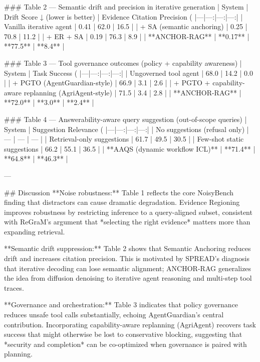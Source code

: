 ### Table 2 — Semantic drift and precision in iterative generation  
| System | Drift Score ↓ (lower is better) | Evidence Citation Precision (%
|---|---:|---:|---:|
| Vanilla iterative agent | 0.41 | 62.0 | 16.5 |
| + SA (semantic anchoring) | 0.25 | 70.8 | 11.2 |
| + ER + SA | 0.19 | 76.3 | 8.9 |
| **ANCHOR-RAG** | **0.17** | **77.5** | **8.4** |

### Table 3 — Tool governance outcomes (policy + capability awareness)  
| System | Task Success (%
|---|---:|---:|---:|
| Ungoverned tool agent | 68.0 | 14.2 | 0.0 |
| + PGTO (AgentGuardian-style) | 66.9 | 3.1 | 2.6 |
| + PGTO + capability-aware replanning (AgriAgent-style) | 71.5 | 3.4 | 2.8 |
| **ANCHOR-RAG** | **72.0** | **3.0** | **2.4** |

### Table 4 — Answerability-aware query suggestion (out-of-scope queries)  
| System | Suggestion Relevance (%
|---|---:|---:|---:|
| No suggestions (refusal only) | — | — | — |
| Retrieval-only suggestions | 61.7 | 49.5 | 30.5 |
| Few-shot static suggestions | 66.2 | 55.1 | 36.5 |
| **AAQS (dynamic workflow ICL)** | **71.4** | **64.8** | **46.3** |

---

## Discussion  
**Noise robustness:** Table 1 reflects the core NoisyBench finding that distractors can cause dramatic degradation. Evidence Regioning improves robustness by restricting inference to a query-aligned subset, consistent with ReGraM’s argument that *selecting the right evidence* matters more than expanding retrieval.  

**Semantic drift suppression:** Table 2 shows that Semantic Anchoring reduces drift and increases citation precision. This is motivated by SPREAD’s diagnosis that iterative decoding can lose semantic alignment; ANCHOR-RAG generalizes the idea from diffusion denoising to iterative agent reasoning and multi-step tool traces.  

**Governance and orchestration:** Table 3 indicates that policy governance reduces unsafe tool calls substantially, echoing AgentGuardian’s central contribution. Incorporating capability-aware replanning (AgriAgent) recovers task success that might otherwise be lost to conservative blocking, suggesting that *security and completion* can be co-optimized when governance is paired with planning.  

